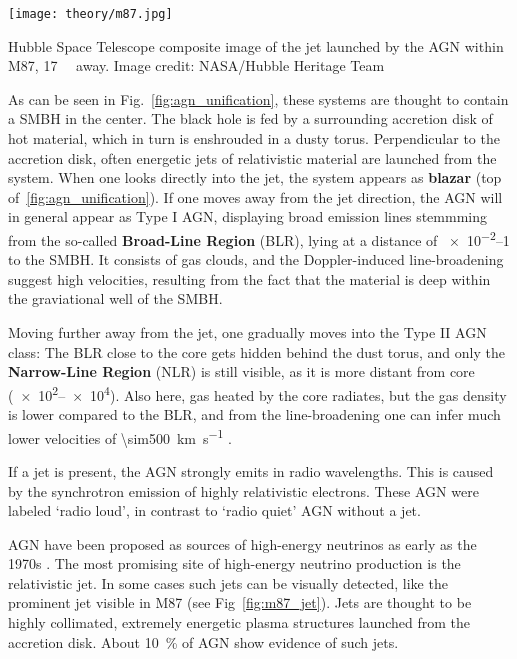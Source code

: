\begin{marginfigure}
    \texttt{[image: theory/m87.jpg]}
    \caption[M87 jet]{Hubble Space Telescope composite image of the jet launched by the AGN within M87, \SI{17}{\mega\parsec} away. Image credit: NASA/Hubble Heritage Team}
\end{marginfigure}

As can be seen in Fig.~\ref{fig:agn_unification}, these systems are thought to contain a SMBH in the center. The black hole is fed by a surrounding accretion disk of hot material, which in turn is enshrouded in a dusty torus. Perpendicular to the accretion disk, often energetic jets of relativistic material are launched from the system. When one looks directly into the jet, the system appears as \textbf{blazar} (top of~\ref{fig:agn_unification}). If one moves away from the jet direction, the AGN will in general appear as Type I AGN, displaying broad emission lines stemmming from the so-called \textbf{Broad-Line Region} (BLR), lying at a distance of \SIrange{e-2}{1}{\parsec} to the SMBH. It consists of gas clouds, and the Doppler-induced line-broadening suggest high velocities, resulting from the fact that the material is deep within the graviational well of the SMBH.

Moving further away from the jet, one gradually moves into the Type II AGN class: The BLR close to the core gets hidden behind the dust torus, and only the  \textbf{Narrow-Line Region} (NLR) is still visible, as it is more distant from core (\SIrange{e2}{e4}{\parsec}). Also here, gas heated by the core radiates, but the gas density is lower compared to the BLR, and from the line-broadening one can infer much lower velocities of \SI{\sim500}{\kilo\m\per\s} .

If a jet is present, the AGN strongly emits in radio wavelengths. This is caused by the synchrotron emission of highly relativistic electrons. These AGN were labeled `radio loud', in contrast to `radio quiet' AGN without a jet.

AGN have been proposed as sources of high-energy neutrinos as early as the 1970s .
The most promising site of high-energy neutrino production is the relativistic jet. In some cases such jets can be visually detected, like the prominent jet visible in M87 (see Fig~\ref{fig:m87_jet}). Jets are thought to be highly collimated, extremely energetic plasma structures launched from the accretion disk. About \SI{10}{\percent} of AGN show evidence of such jets.

